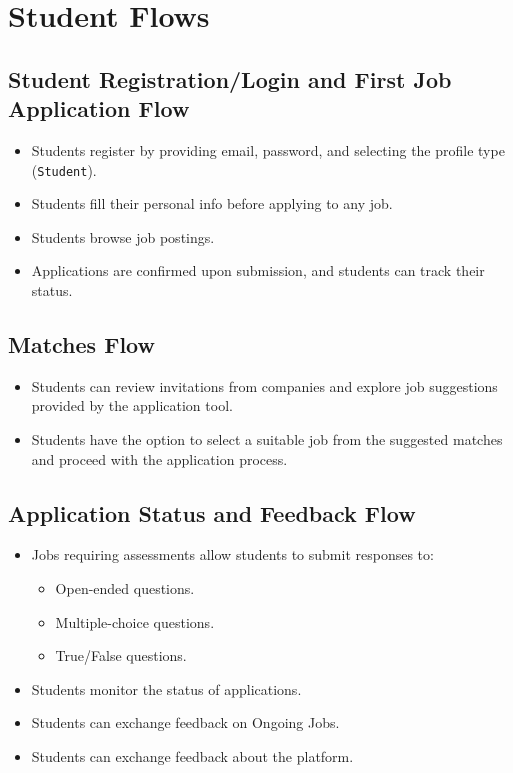 \section{Student Flows}

\subsection{Student Registration/Login and First Job Application Flow}
\begin{itemize}
    \item Students register by providing email, password, and selecting the profile type (\texttt{Student}).
    \item Students fill their personal info before applying to any job.
    \item Students browse job postings.
    \item Applications are confirmed upon submission, and students can track their status.
\end{itemize}

\subsection{Matches Flow}
\begin{itemize}
    \item Students can review invitations from companies and explore job suggestions provided by the application tool.
    \item Students have the option to select a suitable job from the suggested matches and proceed with the application process.
\end{itemize}

\subsection{Application Status and Feedback Flow}
\begin{itemize}
    \item Jobs requiring assessments allow students to submit responses to:
    \begin{itemize}
        \item Open-ended questions.
        \item Multiple-choice questions.
        \item True/False questions.
    \end{itemize}
    \item Students monitor the status of applications.
    \item Students can exchange feedback on Ongoing Jobs.
    \item Students can exchange feedback about the platform.
\end{itemize}
\newpage
